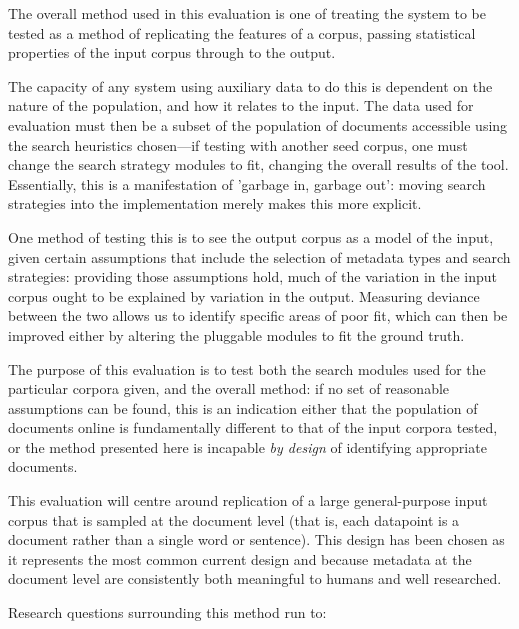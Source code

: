 

The overall method used in this evaluation is one of treating the system to be tested as a method of replicating the features of a corpus, passing statistical properties of the input corpus through to the output.

The capacity of any system using auxiliary data to do this is dependent on the nature of the population, and how it relates to the input.  The data used for evaluation must then be a subset of the population of documents accessible using the search heuristics chosen---if testing with another seed corpus, one must change the search strategy modules to fit, changing the overall results of the tool.  Essentially, this is a manifestation of 'garbage in, garbage out': moving search strategies into the implementation merely makes this more explicit.

One method of testing this is to see the output corpus as a model of the input, given certain assumptions that include the selection of metadata types and search strategies: providing those assumptions hold, much of the variation in the input corpus ought to be explained by variation in the output.  Measuring deviance between the two allows us to identify specific areas of poor fit, which can then be improved either by altering the pluggable modules to fit the ground truth.

The purpose of this evaluation is to test both the search modules used for the particular corpora given, and the overall method: if no set of reasonable assumptions can be found, this is an indication either that the population of documents online is fundamentally different to that of the input corpora tested, or the method presented here is incapable \textsl{by design} of identifying appropriate documents.


This evaluation will centre around replication of a large general-purpose input corpus that is sampled at the document level (that is, each datapoint is a document rather than a single word or sentence).  This design has been chosen as it represents the most common current design and because metadata at the document level are consistently both meaningful to humans and well researched.


Research questions surrounding this method run to:

